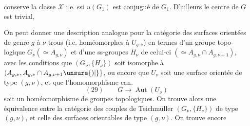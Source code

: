 conserve la classe $\mathcal X$ i.e. ssi $u(G_1)$ est conjugué
de $G_1$. D'ailleurs le centre de $G$ est trivial, 

On peut donner une description analogue
pour la catégorie des surfaces orientées de
genre $g$ à $\nu$ trous (i.e. homéomorphes
à $U_{g,\nu}$) en termes d'un groupe topo-
logique $G_\nu(\simeq A_{g,\nu})$ et d'une 
ss-groupes $H_\nu$ de celui-ci $(\simeq A_{g,\nu}\cap A_{g,\nu+1})$, avec les
conditions que $(G_\nu,\{H_\nu\})$ soit isomorphe
à $(A_{g,\nu},A_{g,\nu}\cap A_{g,\nu+1}\unsure{)|\}}$, ou encore
que $U_\nu$  soit une surface orientée de
type $(g,\nu)$, et que l'homomorphisme can.
\[
(29)\qquad G\longrightarrow\operatorname{Aut}(U_\nu)
\]
soit un homéomorphisme de groupes
topologiques. On trouve alors une
équivalence entre la catégorie des
couples de Teichmüller $(G_\nu,\{H_\nu\})$
de type $(g,\nu)$, et celle des surfaces
orientables de type $(g,\nu)$. On trouve encore
